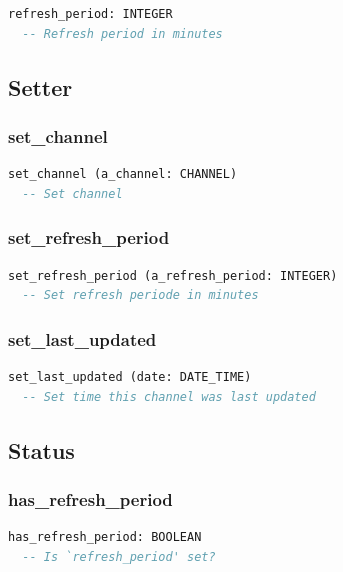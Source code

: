 \begin{lstlisting}[language=Eiffel]
refresh_period: INTEGER
  -- Refresh period in minutes
\end{lstlisting}


\subsection{Setter}
\label{sec:feed-setter}

\subsubsection{set\_channel}

\begin{lstlisting}[language=Eiffel]
set_channel (a_channel: CHANNEL)
  -- Set channel
\end{lstlisting}

\subsubsection{set\_refresh\_period}

\begin{lstlisting}[language=Eiffel]
set_refresh_period (a_refresh_period: INTEGER)
  -- Set refresh periode in minutes
\end{lstlisting}

\subsubsection{set\_last\_updated}

\begin{lstlisting}[language=Eiffel]
set_last_updated (date: DATE_TIME)
  -- Set time this channel was last updated
\end{lstlisting}


\subsection{Status}
\label{sec:feed-status}

\subsubsection{has\_refresh\_period}

\begin{lstlisting}[language=Eiffel]
has_refresh_period: BOOLEAN
  -- Is `refresh_period' set?
\end{lstlisting}

